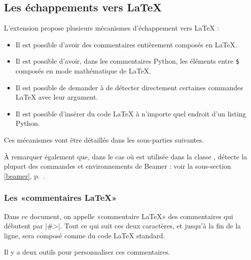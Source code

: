 \documentclass[dvipsnames,svgnames]{article}
\begin{document}
\subsection{Les échappements vers LaTeX}


L'extension  propose plusieurs mécanismes d'échappement vers LaTeX :
\begin{itemize}
\item Il est possible d'avoir des commentaires entièrement composés en LaTeX.
\item Il est possible d'avoir, dans les commentaires Python, les éléments entre \texttt{\$} composés en mode
mathématique de LaTeX.
\item Il est possible de demander à  de détecter directement certaines commandes LaTeX avec leur argument.
\item Il est possible d'insérer du code LaTeX à n'importe quel endroit d'un listing Python.
\end{itemize}
Ces mécanismes vont être détaillés dans les sous-parties suivantes.

\smallskip
À remarquer également que, dans le cas où  est utilisée dans la classe ,  détecte
la plupart des commandes et environnements de Beamer : voir la sous-section \ref{beamer}, p.~\pageref{beamer}.


\subsubsection{Les «commentaires LaTeX»}


Dans ce document, on appelle «commentaire LaTeX» des commentaires qui débutent par |#>|. Tout ce qui suit ces deux 
caractères, et jusqu'à la fin de la ligne, sera composé comme du code LaTeX standard.

Il y a deux outils pour personnaliser ces commentaires.
\end{document}
